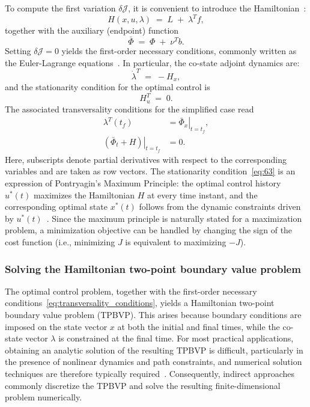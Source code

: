 To compute the first variation $\delta\mathcal{J}$, it is convenient to introduce the Hamiltonian~\cite{Optimization_Review}:
\begin{equation}
H(x,u,\lambda) \;=\; L \;+\; \lambda^{T} f ,
\end{equation}
together with the auxiliary (endpoint) function
\begin{equation}
\bar{\Phi} \;=\; \Phi \;+\; \nu^{T} b .
\end{equation}
Setting $\delta\mathcal{J}=0$ yields the first-order necessary conditions, commonly written as the Euler-Lagrange equations~\cite{Optimization_Review}. In particular, the co-state adjoint dynamics are:
\begin{equation}
\dot{\lambda}^{T} \;=\; -H_{x},
\label{eq:62}
\end{equation}
and the stationarity condition for the optimal control is
\begin{equation}
H_{u}^{T} \;=\; 0 .
\label{eq:63}
\end{equation}
The associated transversality conditions for the simplified case read
\begin{equation}
\label{eq:transversality_conditions}
\begin{aligned}
\lambda^{T}(t_f) &= \left.\bar{\Phi}_{x}\right|_{t=t_f}, \\
\left.(\bar{\Phi}_{t}+H)\right|_{t=t_f} &= 0.
\end{aligned}
\end{equation}
Here, subscripts denote partial derivatives with respect to the corresponding variables and are taken as row vectors. The stationarity condition~\ref{eq:63} is an expression of Pontryagin's Maximum Principle: the optimal control history $u^{*}(t)$ maximizes the Hamiltonian $H$ at every time instant, and the corresponding optimal state $x^{*}(t)$ follows from the dynamic constraints driven by $u^{*}(t)$~\cite{BettsSurvey1998}. Since the maximum principle is naturally stated for a maximization problem, a minimization objective can be handled by changing the sign of the cost function (i.e., minimizing $J$ is equivalent to maximizing $-J$).


\subsubsection{Solving the Hamiltonian two-point boundary value problem}
The optimal control problem, together with the first-order necessary conditions~\ref{eq:transversality_conditions}, yields a Hamiltonian two-point boundary value problem (TPBVP). This arises because boundary conditions are imposed on the state vector $x$ at both the initial and final times, while the co-state vector $\lambda$ is constrained at the final time. For most practical applications, obtaining an analytic solution of the resulting TPBVP is difficult, particularly in the presence of nonlinear dynamics and path constraints, and numerical solution techniques are therefore typically required~\cite{Conway2012SurveyMethodsContinuousDynamicSystems}. Consequently, indirect approaches commonly discretize the TPBVP and solve the resulting finite-dimensional problem numerically.


